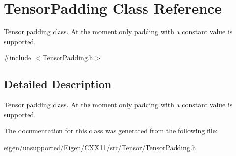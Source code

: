 \hypertarget{class_tensor_padding}{}\section{Tensor\+Padding Class Reference}
\label{class_tensor_padding}


Tensor padding class. At the moment only padding with a constant value is supported.  




{\ttfamily \#include $<$Tensor\+Padding.\+h$>$}



\subsection{Detailed Description}
Tensor padding class. At the moment only padding with a constant value is supported. 

The documentation for this class was generated from the following file\+:\begin{DoxyCompactItemize}
\item 
eigen/unsupported/\+Eigen/\+C\+X\+X11/src/\+Tensor/\+Tensor\+Padding.\+h\end{DoxyCompactItemize}
